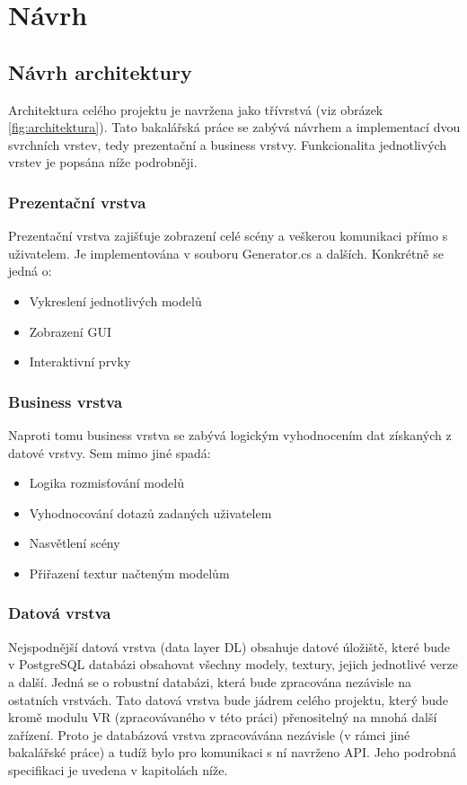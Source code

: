 \documentclass[thesis=B,czech]{FITthesis}[2012/06/26]
\begin{document}
	
	
			

	
\chapter{Návrh}
	\section{Návrh architektury}
	Architektura celého projektu je navržena jako třívrstvá (viz obrázek \ref{fig:architektura}). Tato bakalářská práce se zabývá návrhem a implementací dvou svrchních vrstev, tedy prezentační a business vrstvy. Funkcionalita jednotlivých vrstev je popsána níže podrobněji.
	
	\subsection{Prezentační vrstva}
	Prezentační vrstva zajišťuje zobrazení celé scény a veškerou komunikaci přímo s uživatelem. Je implementována v souboru Generator.cs a dalších. Konkrétně se jedná o:
		\begin{itemize}
			\item Vykreslení jednotlivých modelů
			\item Zobrazení GUI
			\item Interaktivní prvky
		\end{itemize}

	\subsection{Business vrstva}	
	 Naproti tomu business vrstva se zabývá logickým vyhodnocením dat získaných z datové vrstvy. Sem mimo jiné spadá:
	 \begin{itemize}
			\item Logika rozmisťování modelů
			\item Vyhodnocování dotazů zadaných uživatelem
			\item Nasvětlení scény
			\item Přiřazení textur načteným modelům			
		\end{itemize}
	 
	 \subsection{Datová vrstva}
Nejspodnější datová vrstva (data layer DL) obsahuje datové úložiště, které bude v PostgreSQL databázi obsahovat všechny modely, textury, jejich jednotlivé verze a další. Jedná se o robustní databázi, která bude zpracována nezávisle na ostatních vrstvách. Tato datová vrstva bude jádrem celého projektu, který bude kromě modulu VR (zpracovávaného v této práci) přenositelný na mnohá další zařízení. Proto je databázová vrstva zpracovávána nezávisle (v rámci jiné bakalářské práce) a tudíž bylo pro komunikaci s ní navrženo API. Jeho podrobná specifikaci je uvedena v kapitolách níže.
	
\end{document}
